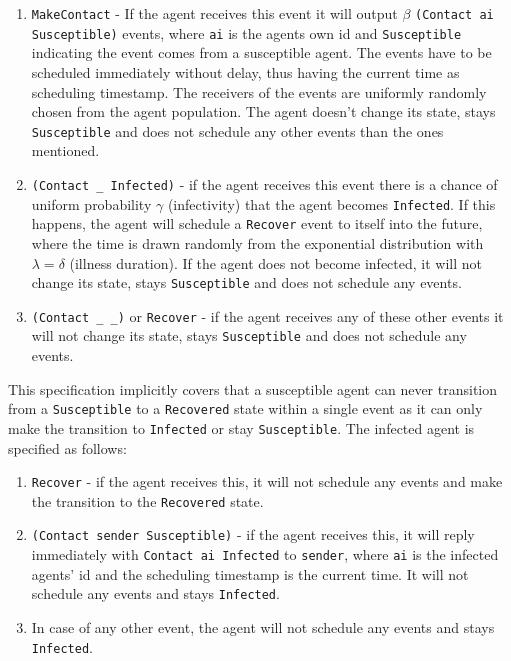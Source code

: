 \begin{enumerate}
	\item \texttt{MakeContact} - If the agent receives this event it will output $\beta$ \texttt{(Contact ai Susceptible)} events, where \texttt{ai} is the agents own id and \texttt{Susceptible} indicating the event comes from a susceptible agent. The events have to be scheduled immediately without delay, thus having the current time as scheduling timestamp. The receivers of the events are uniformly randomly chosen from the agent population. The agent doesn't change its state, stays \texttt{Susceptible} and does not schedule any other events than the ones mentioned.
	
	\item \texttt{(Contact \_ Infected)} - if the agent receives this event there is a chance of uniform probability $\gamma$ (infectivity) that the agent becomes \texttt{Infected}. If this happens, the agent will schedule a \texttt{Recover} event to itself into the future, where the time is drawn randomly from the exponential distribution with $\lambda = \delta$ (illness duration). If the agent does not become infected, it will not change its state, stays \texttt{Susceptible} and does not schedule any events.
	
	\item \texttt{(Contact \_ \_)} or \texttt{Recover} - if the agent receives any of these other events it will not change its state, stays \texttt{Susceptible} and does not schedule any events.
\end{enumerate}

This specification implicitly covers that a susceptible agent can never transition from a \texttt{Susceptible} to a \texttt{Recovered} state within a single event as it can only make the transition to \texttt{Infected} or stay \texttt{Susceptible}. The infected agent is specified as follows:

\begin{enumerate}
	\item \texttt{Recover} - if the agent receives this, it will not schedule any events and make the transition to the \texttt{Recovered} state.
	
	\item \texttt{(Contact sender Susceptible)} - if the agent receives this, it will reply immediately with \texttt{Contact ai Infected} to \texttt{sender}, where \texttt{ai} is the infected agents' id and the scheduling timestamp is the current time. It will not schedule any events and stays \texttt{Infected}.
	
	\item In case of any other event, the agent will not schedule any events and stays \texttt{Infected}.
\end{enumerate}

